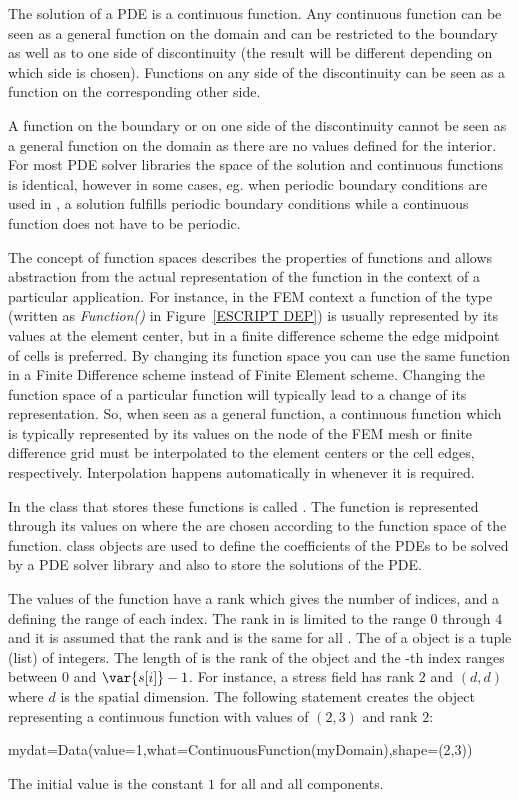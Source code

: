The solution of a PDE is a continuous function. Any continuous function can be seen as a general function
on the domain and can be restricted to the boundary as well as to one side of
discontinuity (the result will be different depending on 
which side is chosen). Functions on any side of the  
discontinuity can be seen as a function on the corresponding other side. 

A function on the boundary or on one side of
the discontinuity cannot be seen as a general function on the domain as there are no values 
defined for the interior. For most PDE solver libraries
the space of the solution and continuous functions is identical, however in some cases, eg.
when periodic boundary conditions are used in \finley, a solution 
fulfills periodic boundary conditions while a continuous function does not have to be periodic.

The concept of function spaces describes the properties of 
functions and allows abstraction from the actual representation 
of the function in the context of a particular application. For instance, 
in the FEM context a
function of the \Function type (written as \emph{Function()} in Figure~\ref{ESCRIPT DEP})
is usually represented by its values at the element center, 
but in a finite difference scheme the edge midpoint of cells is preferred. 
By changing its function space you can use the same function in a Finite Difference
scheme instead of Finite Element scheme.
Changing the function space of a particular function
will typically lead to a change of its representation. 
So, when seen as a general function,
a continuous function which is typically represented by its values
on the node of the FEM mesh or finite difference grid 
must be interpolated to the element centers or the cell edges,
respectively. Interpolation happens automatically in \escript
whenever it is required.

In \escript the class that stores these functions is called \Data.
The function is represented through its values on \DataSamplePoints where
the \DataSamplePoints are chosen according to the function space 
of the function.  
\Data class objects are used to define the coefficients
of the PDEs to be solved by a PDE solver library 
and also to store the solutions of the PDE.

The values of the function have a rank which gives the
number of indices, and a \Shape defining the range of each index.
The rank in \escript is limited to the range $0$ through $4$ and
it is assumed that the rank and \Shape is the same for all \DataSamplePoints.
The \Shape of a \Data object is a tuple (list)  of integers. The length
of  is the rank of the \Data object and the -th index ranges between $0$ and $\var{s[i]}-1$.
For instance, a stress field has rank $2$ and 
\Shape $(d,d)$ where $d$ is the spatial dimension.
The following statement creates the \Data object
 representing a 
continuous function with values 
of \Shape $(2,3)$ and rank $2$:
\begin{python}
  mydat=Data(value=1,what=ContinuousFunction(myDomain),shape=(2,3))
\end{python}
The initial value is the constant $1$ for all \DataSamplePoints and
all components.

